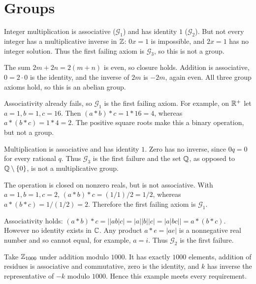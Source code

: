 \section{Groups}


Integer multiplication is associative ($\mathcal G_1$) and has identity $1$ ($\mathcal G_2$). But not every integer has a multiplicative inverse in $\mathbb{Z}$: $0x=1$ is impossible, and $2x=1$ has no integer solution. Thus the first failing axiom is $\mathcal G_3$, so this is not a group.


The sum $2m+2n=2(m+n)$ is even, so closure holds. Addition is associative, $0=2\cdot0$ is the identity, and the inverse of $2m$ is $-2m$, again even. All three group axioms hold, so this is an abelian group.


Associativity already fails, so $\mathcal G_1$ is the first failing axiom. For example, on $\mathbb{R}^+$ let $a=1,b=1,c=16$. Then $(a*b)*c=1*16=4$, whereas $a*(b*c)=1*4=2$. The positive square roots make this a binary operation, but not a group.


Multiplication is associative and has identity $1$. Zero has no inverse, since $0q=0$ for every rational $q$. Thus $\mathcal G_3$ is the first failure and the set $\mathbb{Q}$, as opposed to $\mathbb{Q}\setminus\{0\}$, is not a multiplicative group.


The operation is closed on nonzero reals, but is not associative. With $a=1,b=1,c=2$, $(a*b)*c=(1/1)/2=1/2$, whereas $a*(b*c)=1/(1/2)=2$. Therefore the first failing axiom is $\mathcal G_1$.


Associativity holds: $(a*b)*c=\big||ab|c\big|=|a||b||c|=\big|a|bc|\big|=a*(b*c)$. However no identity exists in $\mathbb{C}$. Any product $a*e=|ae|$ is a nonnegative real number and so cannot equal, for example, $a=i$. Thus $\mathcal G_2$ is the first failure.


Take $\mathbb{Z}_{1000}$ under addition modulo $1000$. It has exactly $1000$ elements, addition of residues is associative and commutative, zero is the identity, and $k$ has inverse the representative of $-k$ modulo $1000$. Hence this example meets every requirement.

